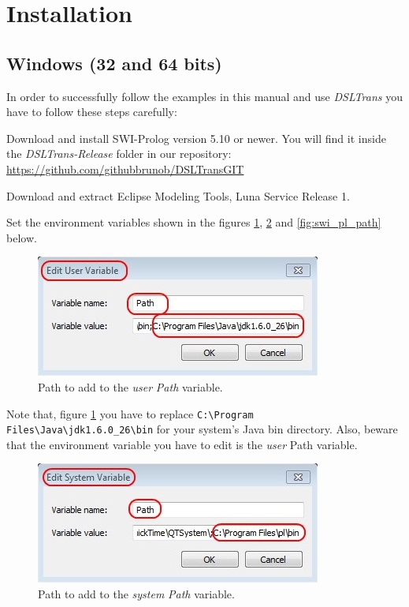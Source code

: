 ﻿\section{Installation}
\label{sec:installation}

\subsection{Windows (32 and 64 bits)}

In order to successfully follow the examples in this manual and use
\emph{DSLTrans} you have to follow these steps carefully:

Download and install SWI-Prolog version 5.10 or newer. You will find it inside the \emph{DSLTrans-Release} folder in our repository:
\url{https://github.com/githubbrunob/DSLTransGIT}

Download and extract Eclipse Modeling Tools, Luna Service Release 1.

Set the environment variables shown in the figures \ref{fig:path_user}, \ref{fig:path_system} and \ref{fig:swi_pl_path} below.

\begin{figure}[h]
\begin{center}
  \includegraphics[scale=0.9]{imgs/path_user.jpg}
  \caption{Path to add to the \emph{user} \emph{Path} variable.}
  \label{fig:path_user}
\end{center}
\end{figure}

Note that, figure \ref{fig:path_user} you have to replace \verb=C:\Program Files\Java\jdk1.6.0_26\bin=
for your system's Java bin directory. Also, beware that the environment
variable you have to edit is the \emph{user} Path variable.

\begin{figure}[h]
\begin{center}
  \includegraphics[scale=0.9]{imgs/path_system.jpg}
  \caption{Path to add to the \emph{system} \emph{Path} variable.}
  \label{fig:path_system}
\end{center}
\end{figure}

